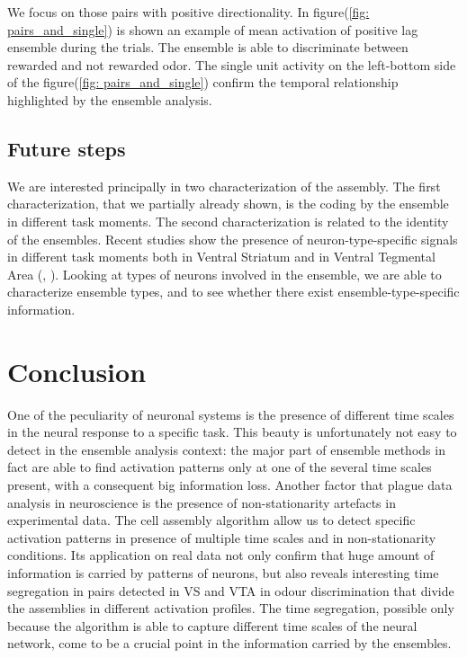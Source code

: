 \documentclass{article}
\begin{document}
We focus on those pairs with positive directionality. In figure(\ref{fig: pairs_and_single}) is shown an example of mean activation of positive lag ensemble during the trials. The ensemble is able to discriminate between rewarded and not rewarded odor.
The single unit activity on the left-bottom side of the figure({\ref{fig: pairs_and_single}}) confirm the temporal relationship highlighted by the ensemble analysis.
\subsection{Future steps}
We are interested principally in two characterization of the assembly. The first characterization, that we partially already shown, is the coding by the ensemble in different task moments.
The second characterization is related to the identity of the ensembles. Recent studies show the presence of neuron-type-specific signals in different task moments both in Ventral Striatum and in Ventral Tegmental Area (\cite{Atallah}, \cite{Cohen}). Looking at types of neurons involved in the ensemble, we are able to characterize ensemble types, and to see whether there exist ensemble-type-specific information.

\section{Conclusion}
One of the peculiarity of neuronal systems is the presence of different time scales in the neural response to a specific task. This beauty is unfortunately not easy to detect in the ensemble analysis context: the major part of ensemble methods in fact are able to find activation patterns only at one of the several time scales present, with a consequent big information loss.
Another factor that plague data analysis in neuroscience is the presence of non-stationarity artefacts in experimental data.
The cell assembly algorithm allow us to detect specific activation patterns in presence of multiple time scales and in non-stationarity conditions.
Its application on real data not only confirm that huge amount of information is carried by patterns of neurons, but also reveals interesting time segregation in pairs detected in VS and VTA in odour discrimination that divide the assemblies in different activation profiles. The time segregation, possible only because the algorithm is able to capture different time scales of the neural network, come to be a crucial point in the information carried by the ensembles.
\newpage

\printbibliography

%






\end{document}
